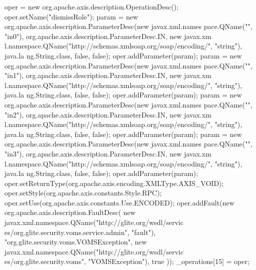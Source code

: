 \begin{DoxyCode}
{        oper = new org.apache.axis.description.OperationDesc();
        oper.setName("dismissRole");
        param = new org.apache.axis.description.ParameterDesc(new javax.xml.names
      pace.QName("", "in0"), org.apache.axis.description.ParameterDesc.IN, new javax.xm
      l.namespace.QName("http://schemas.xmlsoap.org/soap/encoding/", "string"), java.la
      ng.String.class, false, false);
        oper.addParameter(param);
        param = new org.apache.axis.description.ParameterDesc(new javax.xml.names
      pace.QName("", "in1"), org.apache.axis.description.ParameterDesc.IN, new javax.xm
      l.namespace.QName("http://schemas.xmlsoap.org/soap/encoding/", "string"), java.la
      ng.String.class, false, false);
        oper.addParameter(param);
        param = new org.apache.axis.description.ParameterDesc(new javax.xml.names
      pace.QName("", "in2"), org.apache.axis.description.ParameterDesc.IN, new javax.xm
      l.namespace.QName("http://schemas.xmlsoap.org/soap/encoding/", "string"), java.la
      ng.String.class, false, false);
        oper.addParameter(param);
        param = new org.apache.axis.description.ParameterDesc(new javax.xml.names
      pace.QName("", "in3"), org.apache.axis.description.ParameterDesc.IN, new javax.xm
      l.namespace.QName("http://schemas.xmlsoap.org/soap/encoding/", "string"), java.la
      ng.String.class, false, false);
        oper.addParameter(param);
        oper.setReturnType(org.apache.axis.encoding.XMLType.AXIS_VOID);
        oper.setStyle(org.apache.axis.constants.Style.RPC);
        oper.setUse(org.apache.axis.constants.Use.ENCODED);
        oper.addFault(new org.apache.axis.description.FaultDesc(
                      new javax.xml.namespace.QName("http://glite.org/wsdl/servic
      es/org.glite.security.voms.service.admin", "fault"),
                      "org.glite.security.voms.VOMSException",
                      new javax.xml.namespace.QName("http://glite.org/wsdl/servic
      es/org.glite.security.voms", "VOMSException"), 
                      true
                     ));
        _operations[15] = oper;

}
\end{DoxyCode}
